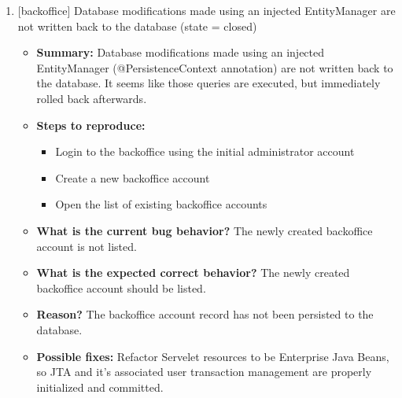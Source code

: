 \begin{enumerate}
\item  {[backoffice] Database modifications made using an injected EntityManager are not written back to the database         (state = closed)}
\begin{itemize}	
	\item \textbf{Summary: } Database modifications made using an injected EntityManager (@PersistenceContext annotation) are not written back to the database. It seems like those queries are executed, but immediately rolled back afterwards.\\
	\item \textbf{Steps to reproduce: }
	\begin{itemize}
		\item Login to the backoffice using the initial administrator account
		\item Create a new backoffice account
		\item Open the list of existing backoffice accounts
	\end{itemize}
	\item \textbf{What is the current bug behavior? } The newly created backoffice account is not listed.\\
	\item \textbf{What is the expected correct behavior? } The newly created backoffice account should be listed.\\
	\item \textbf{Reason? } The backoffice account record has not been persisted to the database.\\
	\item \textbf{Possible fixes: } Refactor Servelet resources to be Enterprise Java Beans, so JTA and it's associated user transaction management are properly initialized and committed.\\
\end{itemize}


\end{enumerate}
